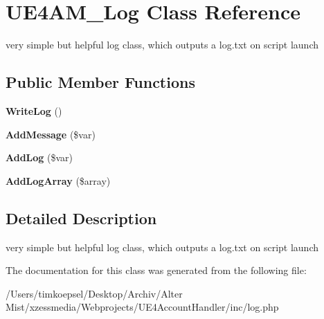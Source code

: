 \hypertarget{class_u_e4_a_m___log}{\section{U\-E4\-A\-M\-\_\-\-Log Class Reference}
\label{class_u_e4_a_m___log}
}


very simple but helpful log class, which outputs a log.\-txt on script launch  


\subsection*{Public Member Functions}
\begin{DoxyCompactItemize}
\item 
\hypertarget{class_u_e4_a_m___log_a2829609acda49134d831405d48547771}{{\bfseries Write\-Log} ()}\label{class_u_e4_a_m___log_a2829609acda49134d831405d48547771}

\item 
\hypertarget{class_u_e4_a_m___log_a8c0d17ad59a3a2b3ecd132a373e664fe}{{\bfseries Add\-Message} (\$var)}\label{class_u_e4_a_m___log_a8c0d17ad59a3a2b3ecd132a373e664fe}

\item 
\hypertarget{class_u_e4_a_m___log_a39d8548a8e51febcd889ec3fffe0d7ed}{{\bfseries Add\-Log} (\$var)}\label{class_u_e4_a_m___log_a39d8548a8e51febcd889ec3fffe0d7ed}

\item 
\hypertarget{class_u_e4_a_m___log_ac26f8c9054a133abb435dd9ff663f6c1}{{\bfseries Add\-Log\-Array} (\$array)}\label{class_u_e4_a_m___log_ac26f8c9054a133abb435dd9ff663f6c1}

\end{DoxyCompactItemize}


\subsection{Detailed Description}
very simple but helpful log class, which outputs a log.\-txt on script launch 

The documentation for this class was generated from the following file\-:\begin{DoxyCompactItemize}
\item 
/\-Users/timkoepsel/\-Desktop/\-Archiv/\-Alter Mist/xzessmedia/\-Webprojects/\-U\-E4\-Account\-Handler/inc/log.\-php\end{DoxyCompactItemize}
